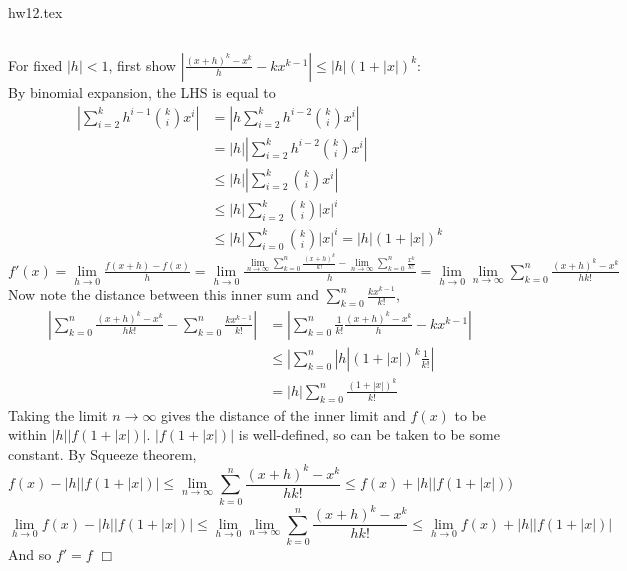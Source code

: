 hw12.tex\documentclass{article}
\begin{document}
\subsection{}
For fixed $|h|<1$, first show $\left|\frac{(x+h)^k - x^k}{h} - kx^{k-1}\right| \leq |h|(1+|x|)^k$:\\
By binomial expansion, the LHS is equal to 
\begin{equation*}
    \begin{split}
        \left|\sum\limits_{i=2}^k h^{i-1} {k\choose i}x^i\right| &= \left|h\sum\limits_{i=2}^k h^{i-2} {k\choose i}x^i\right|\\
        &= |h|\left|\sum\limits_{i=2}^k h^{i-2} {k\choose i}x^i\right|\\
        &\leq |h|\left|\sum\limits_{i=2}^k {k\choose i}x^i\right|\\
        &\leq |h|\sum\limits_{i=2}^k {k\choose i}|x|^i\\
        &\leq |h|\sum\limits_{i=0}^k {k\choose i}|x|^i = |h|(1+|x|)^k
    \end{split}
\end{equation*}
$f'(x) = \lim\limits_{h\rightarrow0} \frac{f(x+h) - f(x)}{h} = \lim\limits_{h\rightarrow0} \frac{\lim\limits_{n\rightarrow\infty}\sum\limits_{k=0}^n \frac{(x+h)^k}{k!} - \lim\limits_{n\rightarrow\infty}\sum\limits_{k=0}^n \frac{x^k}{k!}}{h} = \lim\limits_{h\rightarrow0} \lim\limits_{n\rightarrow\infty}\sum\limits_{k=0}^n \frac{(x+h)^k-x^k}{hk!}$
Now note the distance between this inner sum and $\sum\limits_{k=0}^n \frac{kx^{k-1}}{k!}$,
\begin{equation*}
    \begin{split}
        |\sum\limits_{k=0}^n \frac{(x+h)^k-x^k}{hk!} - \sum\limits_{k=0}^n \frac{kx^{k-1}}{k!}| &= |\sum\limits_{k=0}^n \frac{1}{k!}\frac{(x+h)^k-x^k}{h} - kx^{k-1}|\\
        &\leq |\sum\limits_{k=0}^n |h|(1+|x|)^k \frac{1}{k!}|\\
        &= |h|\sum\limits_{k=0}^n \frac{(1+|x|)^k}{k!}
    \end{split}
\end{equation*}
Taking the limit $n\rightarrow\infty$ gives the distance of the inner limit and $f(x)$ to be within $|h||f(1+|x|)|$. $|f(1+|x|)|$ is well-defined, so can be taken to be some constant. By Squeeze theorem,
$$f(x) - |h||f(1+|x|)| \leq \lim\limits_{n\rightarrow\infty}\sum\limits_{k=0}^n \frac{(x+h)^k-x^k}{hk!} \leq f(x) + |h||f(1+|x|))$$
$$\lim\limits_{h\rightarrow0} f(x) - |h||f(1+|x|)| \leq \lim\limits_{h\rightarrow0} \lim\limits_{n\rightarrow\infty}\sum\limits_{k=0}^n \frac{(x+h)^k-x^k}{hk!} \leq \lim\limits_{h\rightarrow0} f(x) + |h||f(1+|x|)|$$
And so $f' = f$ $\Box$
\end{document}
